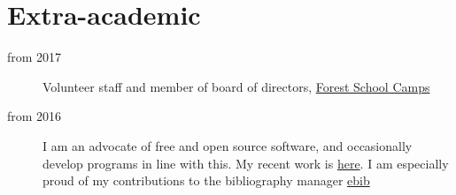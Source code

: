\documentclass{cv}
\begin{document}
\section*{Extra-academic}
\label{sec:org24befa6}
\begin{description}
\item[{from 2017}] Volunteer staff and member of board of directors,
\href{https:\slash{}\slash{}www.fsc.org.uk\slash{}}{Forest School Camps}
\item[{from 2016}] I am an advocate of free and open source software, and
occasionally develop programs in line with this. My recent work is
\href{https:\slash{}\slash{}github.com\slash{}Hugo-Heagren}{here}. I am especially proud of my contributions to the bibliography
manager \href{https:\slash{}\slash{}joostkremers.github.io\slash{}ebib\slash{}}{ebib}
\end{description}
\end{document}
